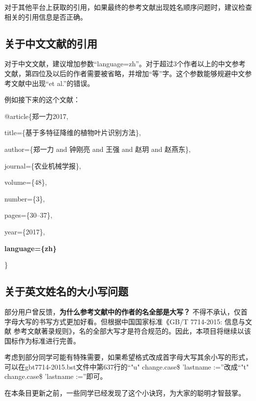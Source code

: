 对于其他平台上获取的引用，如果最终的参考文献出现姓名顺序问题时，建议检查相关的引用信息是否正确。

\subsection{关于中文文献的引用}

对于中文文献，建议增加参数“language={zh}”。对于超过3个作者以上的中文参考文献，第四位及以后的作者需要被省略，并增加“等”字。这个参数能够规避中文参考文献中出现“et al.”的错误。

例如接下来的这个文献：

@article\{郑一力2017,

  \hspace{2em} title=\{基于多特征降维的植物叶片识别方法\},
  
  \hspace{2em} author=\{郑一力 and 钟刚亮 and 王强 and 赵玥 and 赵燕东\},
  
  \hspace{2em} journal=\{农业机械学报\},
  
  \hspace{2em} volume=\{48\},
  
  \hspace{2em} number=\{3\},
  
  \hspace{2em} pages=\{30--37\},
  
  \hspace{2em} year=\{2017\},
  
  \hspace{2em} \textbf{language=\{zh\}}
  
\}

\subsection{关于英文姓名的大小写问题}

部分用户曾反馈，\textbf{为什么参考文献中的作者的名全部是大写？}
不得不承认，仅首字母大写的书写方式更加好看。但根据中国国家标准《GB/T 7714-2015: 信息与文献 参考文献著录规则》，名的全部大写才是符合规范的。因此，本项目将继续以该国标作为标准进行完善。

考虑到部分同学可能有特殊需要，如果希望格式改成首字母大写其余小写的形式，可以在gbt7714-2015.bst文件中第637行的“"u" change.case\$ 'lastname :=”改成“"t" change.case\$ 'lastname :=”即可。

在本条目更新之前，一些同学已经发现了这个小诀窍，为大家的聪明才智鼓掌。



